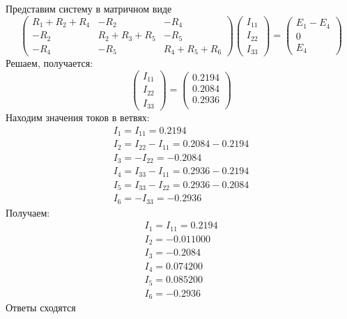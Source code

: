 \documentclass[
]{article}
\begin{document}
Представим систему в матричном виде \[
\begin{pmatrix}
R_{1} + R_{2} + R_{4} & -R_{2} & -R_{4} \\
-R_{2} & R_{2} + R_{3} + R_{5} & -R_{5} \\
-R_{4} & -R_{5} & R_{4} + R_{5} + R_{6}
\end{pmatrix}
\begin{pmatrix}
I_{11} \\
I_{22} \\
I_{33}
\end{pmatrix} = 
\begin{pmatrix}
E_{1} - E_{4} \\
0 \\
E_{4}
\end{pmatrix}
\] Решаем, получается: \[
\begin{pmatrix}
I_{11} \\
I_{22} \\
I_{33}
\end{pmatrix} = 
\begin{pmatrix}
0.2194\\
0.2084\\
0.2936\\
\end{pmatrix}
\] Находим значения токов в ветвях: \[
\begin{gather}
I_{1} = I_{11} = 0.2194\\
I_{2} = I_{22} - I_{11} = 0.2084 - 0.2194\\
I_{3} = -I_{22} = -0.2084\\
I_{4} = I_{33} - I_{11} = 0.2936 - 0.2194\\
I_{5} = I_{33} - I_{22} = 0.2936 -0.2084\\
I_{6} = -I_{33} = -0.2936
\end{gather}
\] Получаем: \[
\begin{gather}
I_{1} = I_{11} = 0.2194\\
I_{2} = -0.011000\\
I_{3} = -0.2084\\
I_{4} = 0.074200\\
I_{5} = 0.085200\\
I_{6} = -0.2936
\end{gather}
\] Ответы сходятся
\end{document}
